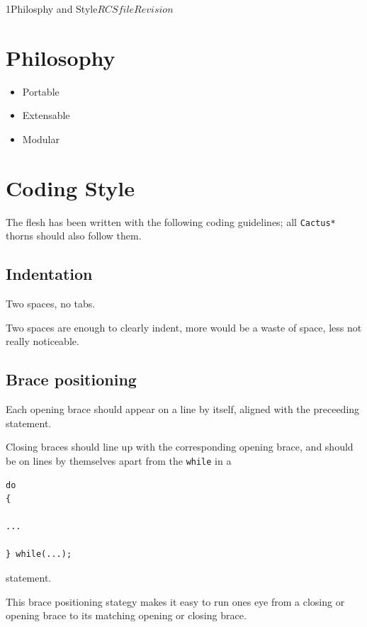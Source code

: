 %   
\begin{cactuspart}{1}{Philosphy and Style}{$RCSfile$}{$Revision$}
\renewcommand{\thepage}{\Alph{part}\arabic{page}}

\chapter{Philosophy} 

\begin{itemize}
\item
Portable
\item
Extensable
\item
Modular
\end{itemize}

\chapter{Coding Style}

The flesh has been written with the following coding guidelines;
all {\tt Cactus*} thorns should also follow them.


\section{Indentation}

Two spaces, no tabs.

Two spaces are enough to clearly indent, more would be a waste of
space, less not really noticeable.

\section{Brace positioning}

Each opening brace should appear on a line by itself,
aligned with the preceeding statement.

Closing braces should line up with the corresponding
opening brace, and should be on lines by themselves
apart from the {\tt while} in a 
%
\begin{verbatim}
do
{

...

} while(...);

\end{verbatim}
%
statement.

This brace positioning stategy makes it easy to run ones eye from a closing
or opening brace to its matching opening or closing brace.


\end{cactuspart}
